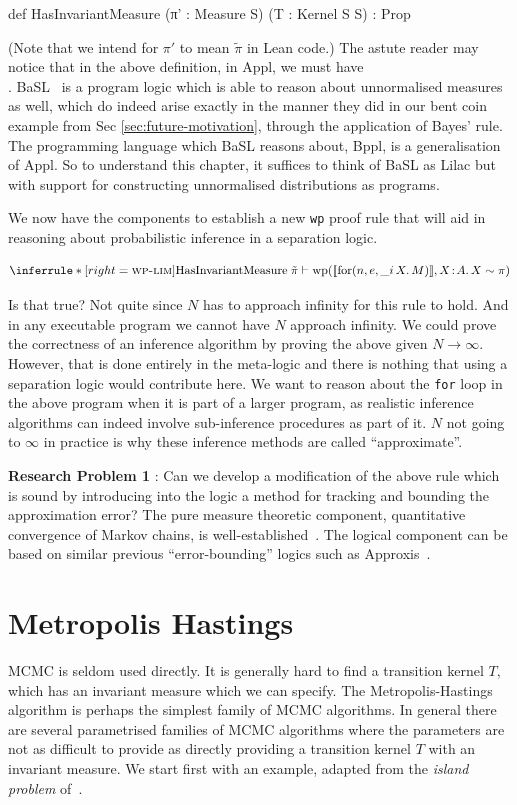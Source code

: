 \begin{leancode}
def HasInvariantMeasure (π' : Measure S) (T : Kernel S S) : Prop
\end{leancode}

(Note that we intend for $\pi'$ to mean $\tilde{\pi}$ in Lean code.) The astute reader may notice that in the above definition, in Appl, we must have\\ . BaSL~\citep{basl} is a program logic which
is able to reason about unnormalised measures as well, which do indeed arise exactly in the manner they did in our bent coin example from Sec \ref{sec:future-motivation},
through the application of Bayes' rule. The programming language which BaSL reasons about, Bppl, is a generalisation of Appl. So to understand this chapter, it
suffices to think of BaSL as Lilac but with support for constructing unnormalised distributions as programs.


We now have the components to establish a new \texttt{wp} proof rule that will aid in reasoning about probabilistic inference in a separation logic.

\[
\inferrule*[right=\textsc{wp-lim}]
  {}
  { \mathrm{HasInvariantMeasure}\;\tilde{\pi} \vdash \mathrm{wp}([\![\mathrm{for}(n,e,\_i\,X.\,M)]\!],X\!:\!A.\,X \sim \pi)}
\]

Is that true? Not quite since $N$ has to approach infinity for this rule to hold. And in any executable program we cannot have $N$ approach infinity. We could prove the correctness of an inference
algorithm by proving the above given $N \to \infty$. However, that is done entirely in the meta-logic and there is nothing that using a separation logic would contribute here.
We want to reason about the \texttt{for} loop in the above program when it is part of a larger program, as realistic inference algorithms can indeed involve sub-inference procedures as part of it.
$N$ not going to $\infty$ in practice is why these inference methods are called ``approximate''. 

\textbf{Research Problem 1} : Can we develop a modification of the above rule which is sound by introducing into the logic a method for tracking and bounding the approximation error?
The pure measure theoretic component, quantitative convergence of Markov chains, is well-established~\citep{meyn-tweedie}. The logical component can be based on similar
previous ``error-bounding'' logics such as Approxis~\citep{approxis}.

\section{Metropolis Hastings}
MCMC is seldom used directly. It is generally hard to find a transition kernel $T$, which has an invariant measure which we can specify. The Metropolis-Hastings
algorithm is perhaps the simplest family of MCMC algorithms. In general there are several parametrised families of MCMC algorithms where the parameters are
not as difficult to provide as directly providing a transition kernel $T$ with an invariant measure.
We start first with an example, adapted from the \emph{island problem} of~\citet{eliot}.

